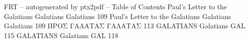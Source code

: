 \id FRT -- autogenerated by ptx2pdf --
\is Table of Contents
\tr {} Paul’s Letter to the Galatians Galatians Galatians 109
\tr {} Paul’s Letter to the Galatians Galatians Galatians 109
\tr {} ΠΡΟΣ ΓΑΛΑΤΑΣ ΓΑΛΑΤΑΣ 113
\tr {} GALATIANS Galatians GAL 115
\tr {} GALATIANS Galatians GAL 118
